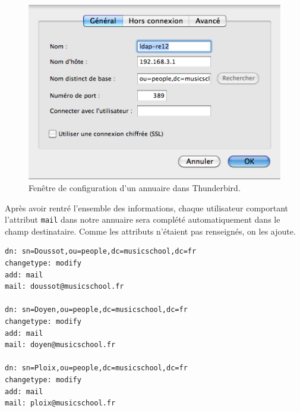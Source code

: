 \documentclass[12pt,a4paper,notitlepage]{article}
\begin{document}
\begin{figure}[!h]
\begin{center}
\includegraphics[scale=0.61]{thunderbird-ldap}
\caption{Fenêtre de configuration d'un annuaire dans Thunderbird.}
\label{fig:da}
\end{center}
\end{figure}

Après avoir rentré l'ensemble des informations, chaque utilisateur comportant l'attribut \texttt{mail} dans notre annuaire sera complété automatiquement dans le champ destinataire. Comme les attributs n'étaient pas renseignés, on les ajoute.\\

\begin{lstlisting}[title=ajout-mail.ldif]
dn: sn=Doussot,ou=people,dc=musicschool,dc=fr
changetype: modify
add: mail
mail: doussot@musicschool.fr

dn: sn=Doyen,ou=people,dc=musicschool,dc=fr
changetype: modify
add: mail
mail: doyen@musicschool.fr

dn: sn=Ploix,ou=people,dc=musicschool,dc=fr
changetype: modify
add: mail
mail: ploix@musicschool.fr
\end{lstlisting}
\end{document}
